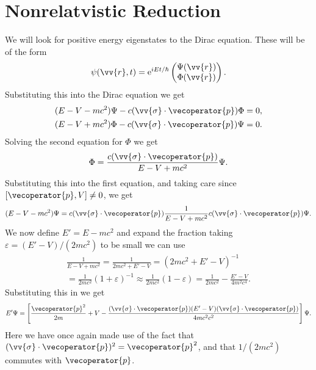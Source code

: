\documentclass[fleqn]{NotesClass}
\newcommand*{\e}{\mathrm{e}}
\begin{document}
    \section{Nonrelatvistic Reduction}
    We will look for positive energy eigenstates to the Dirac equation.
    These will be of the form
    \begin{equation}
        \psi(\vv{r}, t) = \e^{iEt/\hbar}
        \begin{pmatrix}
            \Psi(\vv{r})\\ \Phi(\vv{r})
        \end{pmatrix}
        .
    \end{equation}
    Substituting this into the Dirac equation we get
    \begin{align}
        (E - V - mc^2) \Psi - c(\vv{\sigma} \cdot \vecoperator{p})\Phi &= 0,\\
        (E - V + mc^2) \Phi - c(\vv{\sigma} \cdot \vecoperator{p})\Psi &= 0.
    \end{align}
    Solving the second equation for \(\Phi\) we get
    \begin{equation}
        \Phi = \frac{c(\vv{\sigma} \cdot \vecoperator{p})}{E - V + mc^2} \Psi.
    \end{equation}
    Substituting this into the first equation, and taking care since \([\vecoperator{p}, V] \ne 0\), we get
    \begin{equation}
        (E - V - mc^2) \Psi = c(\vv{\sigma} \cdot \vecoperator{p}) \frac{1}{E - V + mc^2} c(\vv{\sigma} \cdot \vecoperator{p}) \Psi.
    \end{equation}
    We now define \(E' = E - mc^2\) and expand the fraction taking \(\varepsilon = (E' - V)/(2mc^2)\) to be small we can use
    \begin{multline}
        \frac{1}{E - V + mc^2} = \frac{1}{2mc^2 + E' - V} = (2mc^2 + E' - V)^{-1}\\
        = \frac{1}{2mc^2}\left( 1 + \varepsilon \right)^{-1}
        \approx \frac{1}{2mc^2} \left( 1 - \varepsilon \right) = \frac{1}{2mc^2} - \frac{E' - V}{4m^2c^4}.
    \end{multline}
    Substituting this in we get
    \begin{equation}
        E' \Psi = \left[ \frac{\vecoperator{p}^2}{2m} + V - \frac{(\vv{\sigma} \cdot \vecoperator{p})(E' - V)(\vv{\sigma} \cdot \vecoperator{p})}{4mc^2c^2} \right]\Psi.
    \end{equation}
    Here we have once again made use of the fact that \((\vv{\sigma} \cdot \vecoperator{p})^2 = \vecoperator{p}^2\), and that \(1/(2mc^2)\) commutes with \(\vecoperator{p}\).
    
\end{document}
